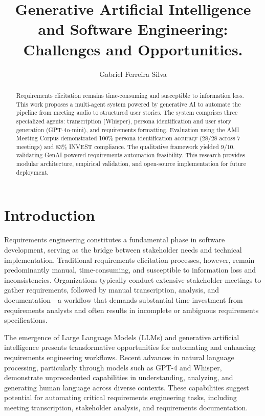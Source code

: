 \documentclass[12pt]{article}
\title{Generative Artificial Intelligence and Software Engineering: Challenges and Opportunities.}
\author{Gabriel Ferreira Silva\inst{1}}
\begin{document}
 

\maketitle

\begin{abstract}
Requirements elicitation remains time-consuming and susceptible to information loss. This work proposes a multi-agent system powered by generative AI to automate the pipeline from meeting audio to structured user stories. The system comprises three specialized agents: transcription (Whisper), persona identification and user story generation (GPT-4o-mini), and requirements formatting. Evaluation using the AMI Meeting Corpus demonstrated 100\% persona identification accuracy (28/28 across 7 meetings) and 83\% INVEST compliance. The qualitative framework yielded 9/10, validating GenAI-powered requirements automation feasibility. This research provides modular architecture, empirical validation, and open-source implementation for future deployment.
\end{abstract}


\section{Introduction}
\label{sec:introduction}

Requirements engineering constitutes a fundamental phase in software development, serving as the bridge between stakeholder needs and technical implementation. Traditional requirements elicitation processes, however, remain predominantly manual, time-consuming, and susceptible to information loss and inconsistencies. Organizations typically conduct extensive stakeholder meetings to gather requirements, followed by manual transcription, analysis, and documentation—a workflow that demands substantial time investment from requirements analysts and often results in incomplete or ambiguous requirements specifications.

The emergence of Large Language Models (LLMs) and generative artificial intelligence presents transformative opportunities for automating and enhancing requirements engineering workflows. Recent advances in natural language processing, particularly through models such as GPT-4 and Whisper, demonstrate unprecedented capabilities in understanding, analyzing, and generating human language across diverse contexts. These capabilities suggest potential for automating critical requirements engineering tasks, including meeting transcription, stakeholder analysis, and requirements documentation.
\end{document}
